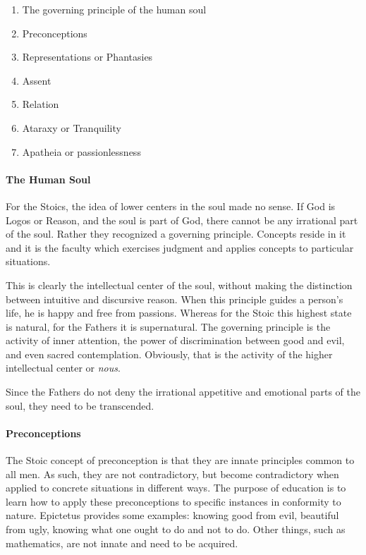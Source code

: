 \begin{enumerate}
\item The governing principle of the human soul 
\item Preconceptions 
\item Representations or Phantasies 
\item Assent 
\item Relation 
\item Ataraxy or Tranquility 
\item Apatheia or passionlessness 
\end{enumerate}
\paragraph{The Human Soul}
For the Stoics, the idea of lower centers in the soul made no sense. If God is Logos or Reason, and the soul is part of
God, there cannot be any irrational part of the soul. Rather they recognized a governing principle. Concepts reside in
it and it is the faculty which exercises judgment and applies concepts to particular situations.

This is clearly the intellectual center of the soul, without making the distinction between intuitive and discursive
reason. When this principle guides a person’s life, he is happy and free from passions. Whereas for the
Stoic this highest state is natural, for the Fathers it is supernatural. The governing principle is the activity of
inner attention, the power of discrimination between good and evil, and even sacred contemplation. Obviously, that is
the activity of the higher intellectual center or \emph{nous}.

Since the Fathers do not deny the irrational appetitive and emotional parts of the soul, they need to be transcended.

\paragraph{Preconceptions}
The Stoic concept of preconception is that they are innate principles common to all men. As such, they are not
contradictory, but become contradictory when applied to concrete situations in different ways. The purpose of education
is to learn how to apply these preconceptions to specific instances in conformity to nature. Epictetus provides some
examples: knowing good from evil, beautiful from ugly, knowing what one ought to do and not to do. Other things, such
as mathematics, are not innate and need to be acquired.

